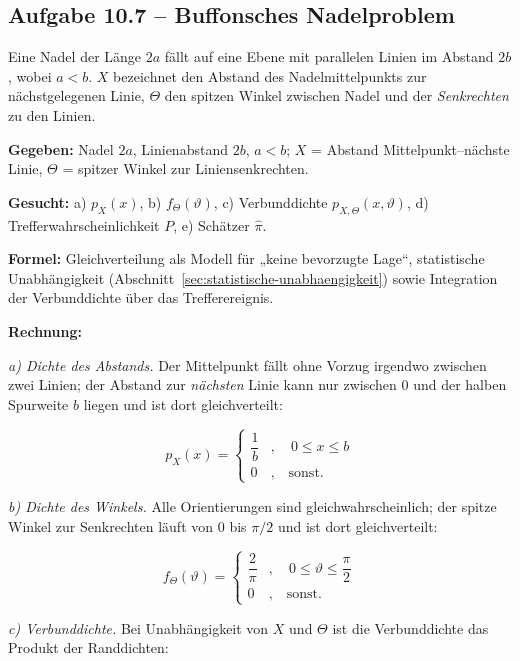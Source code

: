 \subsection*{Aufgabe 10.7 – Buffonsches Nadelproblem}

Eine Nadel der Länge $2a$ fällt auf eine Ebene mit parallelen Linien im Abstand
$2b$, wobei $a < b$. $X$ bezeichnet den Abstand des Nadelmittelpunkts zur
nächstgelegenen Linie, $\Theta$ den spitzen Winkel zwischen Nadel und der
\emph{Senkrechten} zu den Linien.

\begin{beispiel}

\textbf{Gegeben:} Nadel $2a$, Linienabstand $2b$, $a < b$; $X$ = Abstand
Mittelpunkt--nächste Linie, $\Theta$ = spitzer Winkel zur Liniensenkrechten.

\textbf{Gesucht:} a) $p_X(x)$, b) $f_\Theta(\vartheta)$, c) Verbunddichte
$p_{X,\Theta}(x,\vartheta)$, d) Trefferwahrscheinlichkeit $P$, e) Schätzer
$\hat\pi$.

\textbf{Formel:} Gleichverteilung als Modell für „keine bevorzugte Lage``,
statistische Unabhängigkeit (Abschnitt~\ref{sec:statistische-unabhaengigkeit})
sowie Integration der Verbunddichte über das Trefferereignis.

\textbf{Rechnung:}

\emph{a) Dichte des Abstands.} Der Mittelpunkt fällt ohne Vorzug irgendwo
zwischen zwei Linien; der Abstand zur \emph{nächsten} Linie kann nur zwischen
$0$ und der halben Spurweite $b$ liegen und ist dort gleichverteilt:

$$
p_X(x) = \begin{cases} \dfrac{1}{b} & , \quad 0 \leq x \leq b \\[6pt]
0 & , \quad \text{sonst.} \end{cases}
$$

\emph{b) Dichte des Winkels.} Alle Orientierungen sind gleichwahrscheinlich;
der spitze Winkel zur Senkrechten läuft von $0$ bis $\pi/2$ und ist dort
gleichverteilt:

$$
f_\Theta(\vartheta) = \begin{cases} \dfrac{2}{\pi} & , \quad 0 \leq \vartheta \leq \dfrac{\pi}{2} \\[6pt]
0 & , \quad \text{sonst.} \end{cases}
$$

\emph{c) Verbunddichte.} Bei Unabhängigkeit von $X$ und $\Theta$ ist die
Verbunddichte das Produkt der Randdichten:


\end{beispiel}
